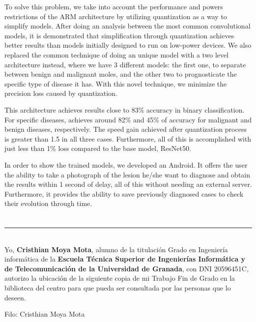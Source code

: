 To solve this problem, we take into account the performance and powers restrictions of the ARM architecture by utilizing quantization as a way to simplify models. After doing an analysis between the most common convolutional models, it is demonstrated that simplification through quantization achieves better results than models initially designed to run on low-power devices.  We also replaced the common technique of doing an unique model with a two level architecture instead, where we have 3 different models: the first one, to separate between benign and malignant moles, and the other two to prognosticate the specific type of disease it has. With this novel technique, we minimize the precision loss caused by quantization.

This architecture achieves results close to 83\% accuracy in binary classification. For specific diseases, achieves around 82\% and 45\% of accuracy for malignant and benign diseases, respectively. The speed gain achieved after quantization process is greater than 1.5 in all three cases. Furthermore, all of this is accomplished with just less than 1\% loss compared to the base model, ResNet50.

In order to show the trained models, we developed an Android. It offers the user the ability to take a photograph of the lesion he/she want to diagnose and obtain the results within 1 second of delay, all of this without needing an external server. Furthermore, it provides the ability to save previously diagnosed cases to check their evolution through time.


\chapter*{}
\thispagestyle{empty}

\noindent\rule[-1ex]{\textwidth}{2pt}\\[4.5ex]

Yo, \textbf{Cristhian Moya Mota}, alumno de la titulación Grado en Ingeniería informática de la \textbf{Escuela Técnica Superior
de Ingenierías Informática y de Telecomunicación de la Universidad de Granada}, con DNI 20596451C, autorizo la
ubicación de la siguiente copia de mi Trabajo Fin de Grado en la biblioteca del centro para que pueda ser
consultada por las personas que lo deseen.

\vspace{6cm}

\noindent Fdo: Cristhian Moya Mota

\vspace{2cm}


